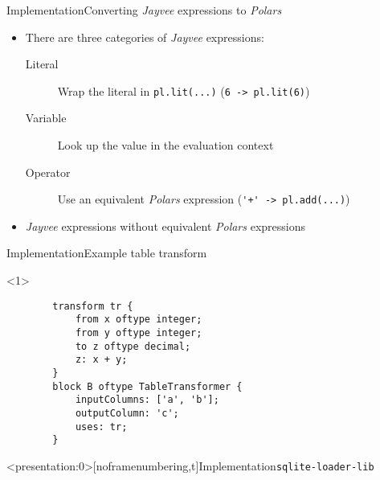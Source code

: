 \begin{frame}[t]{Implementation}{Converting \emph{Jayvee} expressions to \emph{Polars}}
	\begin{itemize}
		\item There are three categories of \emph{Jayvee} expressions\footnotemark[1]:
		      \begin{description}
			      \item[Literal] Wrap the literal in \Verb|pl.lit(...)| (\Verb|6 -> pl.lit(6)|)
			      \item[Variable] Look up the value in the evaluation context
			      \item[Operator] Use an equivalent \emph{Polars} expression (\Verb|'+' -> pl.add(...)|)
		      \end{description}
		\item<2-> \emph{Jayvee} expressions without equivalent \emph{Polars} expressions
	\end{itemize}

\end{frame}
\begin{frame}[fragile]{Implementation}{Example table transform}
	\begin{onlyenv}
		\begin{verbatim}
		transform tr {
			from x oftype integer;
			from y oftype integer;
			to z oftype decimal;
			z: x + y;
		}
		block B oftype TableTransformer {
			inputColumns: ['a', 'b'];
			outputColumn: 'c';
			uses: tr;
		}
		\end{verbatim}
	\end{onlyenv}
	 {
		\begin{figure}
			
		\end{figure}
	}
\end{frame}
\begin{frame}<presentation:0>[noframenumbering,t]{Implementation}{\Verb|sqlite-loader-lib|}
	\begin{figure}
		
	\end{figure}
\end{frame}
